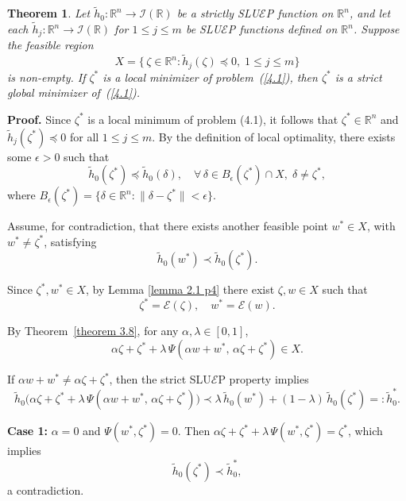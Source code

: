 \documentclass[12pt, reqno]{amsart}
\newtheorem{theorem}{Theorem}[section]
\theoremstyle{definition}
\theoremstyle{remark}
\numberwithin{equation}{section}
\begin{document}
       	\begin{theorem}   
       		Let $\tilde{h}_{0}: \mathbb{R}^{n} \rightarrow \mathcal{I}(\mathbb{R})$ be a \emph{strictly} SLU$\mathcal{E}$P function on $\mathbb{R}^{n}$, and let each $\tilde{h}_{j}: \mathbb{R}^{n} \rightarrow \mathcal{I}(\mathbb{R})$ for $1 \leq j \leq m$ be SLU$\mathcal{E}$P functions defined on $\mathbb{R}^{n}$. Suppose the feasible region
\[
X = \big\{\, \zeta \in \mathbb{R}^{n} : \tilde{h}_{j}(\zeta) \preceq 0, \; 1 \leq j \leq m \big\}
\]
is non-empty. If $\zeta^{*}$ is a local minimizer of problem~\emph{(\ref{4.1})}, then $\zeta^{*}$ is a strict global minimizer of~\emph{(\ref{4.1})}.
       	\end{theorem}
       	\noindent
\textbf{Proof.}  
Since $\zeta^*$ is a local minimum of problem (4.1), it follows that $\zeta^* \in \mathbb{R}^n$ and $\tilde{h}_j(\zeta^*) \preceq 0$ for all $1 \leq j \leq m$. By the definition of local optimality, there exists some $\epsilon > 0$ such that
\[
\tilde{h}_0(\zeta^*) \preceq \tilde{h}_0(\delta), \quad \forall\, \delta \in B_\epsilon(\zeta^*) \cap X,\; \delta \neq \zeta^*,
\]
where $B_\epsilon(\zeta^*) = \{\delta \in \mathbb{R}^n : \|\delta - \zeta^*\| < \epsilon\}$.

\vspace{0.2cm}
\noindent
Assume, for contradiction, that there exists another feasible point $w^* \in X$, with $w^* \neq \zeta^*$, satisfying
\[
\tilde{h}_0(w^*) \prec \tilde{h}_0(\zeta^*).
\]

Since $\zeta^*, w^* \in X$, by Lemma \ref{lemma 2.1 p4} there exist $\zeta, w \in X$ such that
\[
\zeta^* = \mathcal{E}(\zeta), \quad w^* = \mathcal{E}(w).
\]

By Theorem~\ref{theorem 3.8}, for any $\alpha, \lambda \in [0,1]$,
\[
\alpha \zeta + \zeta^* + \lambda\, \Psi(\alpha w + w^*,\, \alpha \zeta + \zeta^*) \in X.
\]

If $\alpha w + w^* \neq \alpha \zeta + \zeta^*$, then the strict SLU$\mathcal{E}$P property implies
\[
\tilde{h}_0\!\big(\alpha \zeta + \zeta^* + \lambda\, \Psi(\alpha w + w^*,\, \alpha \zeta + \zeta^*)\big)
\prec \lambda\, \tilde{h}_0(w^*) + (1-\lambda)\, \tilde{h}_0(\zeta^*) =: \tilde{h}_0^*.
\]

\vspace{0.2cm}
\noindent
\textbf{Case 1:} $\alpha = 0$ and $\Psi(w^*, \zeta^*) = 0$.  
Then $\alpha \zeta + \zeta^* + \lambda\, \Psi(w^*, \zeta^*) = \zeta^*$, which implies
\[
\tilde{h}_0(\zeta^*) \prec \tilde{h}_0^*,
\]
a contradiction.
\end{document}
